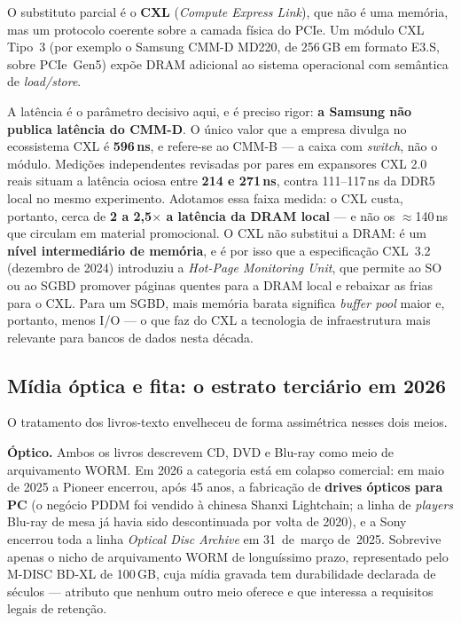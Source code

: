 \documentclass[11pt,a4paper]{article}
\begin{document}
O substituto parcial é o \textbf{CXL} (\emph{Compute Express Link}), que não é uma memória,
mas um protocolo coerente sobre a camada física do PCIe. Um módulo CXL Tipo~3 (por exemplo
o Samsung CMM-D MD220, de 256\,GB em formato E3.S, sobre PCIe~Gen5) expõe DRAM adicional ao
sistema operacional com semântica de \emph{load/store}.

A latência é o parâmetro decisivo aqui, e é preciso rigor: \textbf{a Samsung não publica
latência do CMM-D}. O único valor que a empresa divulga no ecossistema CXL é
\textbf{596\,ns}, e refere-se ao CMM-B --- a caixa com \emph{switch}, não o módulo. Medições
independentes revisadas por pares em expansores CXL 2.0 reais situam a latência ociosa entre
\textbf{214 e 271\,ns}, contra 111--117\,ns da DDR5 local no mesmo experimento. Adotamos essa
faixa medida: o CXL custa, portanto, cerca de \textbf{2 a 2,5$\times$ a latência da DRAM
local} --- e não os $\approx$140\,ns que circulam em material promocional. O CXL não
substitui a DRAM: é um \textbf{nível intermediário de memória}, e é por
isso que a especificação CXL~3.2 (dezembro de 2024) introduziu a \emph{Hot-Page Monitoring
Unit}, que permite ao SO ou ao SGBD promover páginas quentes para a DRAM local e rebaixar
as frias para o CXL. Para um SGBD, mais memória barata significa \emph{buffer pool} maior e,
portanto, menos I/O --- o que faz do CXL a tecnologia de infraestrutura mais relevante para
bancos de dados nesta década.

\subsection{Mídia óptica e fita: o estrato terciário em 2026}

O tratamento dos livros-texto envelheceu de forma assimétrica nesses dois meios.

\textbf{Óptico.} Ambos os livros descrevem CD, DVD e Blu-ray como meio de arquivamento
WORM. Em 2026 a categoria está em colapso comercial: em maio de 2025 a Pioneer encerrou, após 45
anos, a fabricação de \textbf{drives ópticos para PC} (o negócio PDDM foi vendido à chinesa
Shanxi Lightchain; a linha de \emph{players} Blu-ray de mesa já havia sido descontinuada por
volta de 2020), e a Sony encerrou toda a linha \emph{Optical Disc Archive} em 31~de~março
de~2025. Sobrevive apenas o nicho de arquivamento WORM de longuíssimo prazo, representado
pelo M-DISC BD-XL de 100\,GB, cuja mídia gravada tem durabilidade declarada de séculos ---
atributo que nenhum outro meio oferece e que interessa a requisitos legais de retenção.
\end{document}
